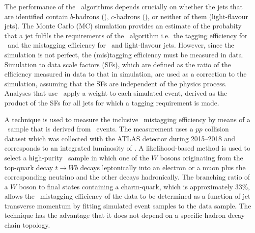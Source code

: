 \documentclass[twoside,11pt]{report}
\begin{document}
    The performance of the
    \btagging\ algorithms depends crucially on whether the jets that are
    identified contain $b$-hadrons (\bjets), $c$-hadrons (\cjets), or neither
    of them (light-flavour jets).
    The Monte Carlo (MC) simulation provides an estimate of the probabity that
    a jet fulfils the requirements of the \btagging\ algorithm i.e.\ the
    tagging efficiency  for \bjets\ and the mistagging
    efficiency for \cjets\ and light-flavour jets. However, since the
    simulation is not perfect, the (mis)tagging efficiency must be
    measured in data. Simulation to data scale factors (SFs), which are defined as the ratio of
    the efficiency measured in data to that in simulation, are used as a
    correction to the simulation, assuming that the SFs
    are independent of the physics process. Analyses that use
    \btagging\  apply a weight to each simulated event, derived as the
    product of the SFs for all jets for which a tagging
    requirement is made.


    A technique is used to measure the inclusive \cjet\ mistagging efficiency by means of a
    \cjet\ sample that is derived from \ttbar\ events.  The measurement uses a
    \(pp\) collision dataset which was collected with the ATLAS
    detector during 2015--2018 and corresponds to an integrated luminosity of 
    \lumi.  A likelihood-based method is used to select a high-purity \ttbar\
    sample in which one of the $W$ bosons originating from the
    top-quark decay $t\to W b$ decays leptonically 
    into an electron or a muon plus the
    corresponding neutrino and the other decays hadronically. The 
    branching ratio of a $W$ boson to 
    final states containing a charm-quark, which is approximately 
    33\%, allows the \cjet\ mistagging efficiency of the data to be
    determined as a function of jet transverse momentum by fitting
    simulated event samples to the data sample.
    The technique has the advantage that it does not depend on a specific
    hadron decay chain topology.
\end{document}
